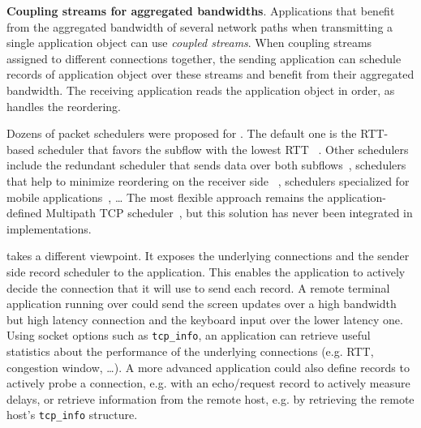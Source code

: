 

\textbf{Coupling streams for aggregated bandwidths}. Applications that benefit
from the aggregated bandwidth of several network paths when transmitting a
single
application object can use \tcpls \textit{coupled streams}.  When coupling
streams assigned to different \tcp connections
together, the sending application can schedule \tcpls records of application
object over these
streams and benefit from their aggregated bandwidth. The receiving application
reads the application object in order, as \tcpls handles the reordering.

Dozens of packet schedulers were proposed for \mptcp. The default one is the
RTT-based scheduler that favors the subflow with the lowest RTT
~\cite{paasch2014experimental}. Other schedulers include the redundant
scheduler
that sends data over both subflows~\cite{frommgen2016remp}, schedulers that
help to minimize reordering on the receiver side~
\cite{lim2017ecf,hurtig2018low}, schedulers specialized for mobile
applications~\cite{de2018tuning}, \ldots
The most flexible approach remains the application-defined Multipath TCP
scheduler~\cite{frommgen2017programming}, but this solution has never been
integrated in \mptcp implementations.

\tcpls takes a different viewpoint. It exposes the underlying \tcp connections
and the sender side \tcpls record scheduler to the application. This enables
the application to actively decide the \tcp connection that it will use to send
each record. A remote terminal application running over \tcpls could send the
screen updates over a high bandwidth but high latency connection and the
keyboard input over the lower latency one.
Using socket options such as
\texttt{tcp\_info}, an application can retrieve useful statistics about the
performance of the underlying \tcp connections (e.g. RTT, congestion window,
\ldots). %
A more advanced application could also define \tcpls records to actively
probe a connection, e.g. with an echo/request record to actively measure
delays, or retrieve information from the remote host, e.g. by retrieving the
remote host's \texttt{tcp\_info} structure.

